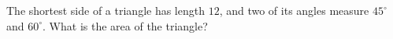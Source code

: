 The shortest side of a triangle has length $12$, and two of its angles measure $45^\circ$ and $60^\circ$. What is the area of the triangle?
